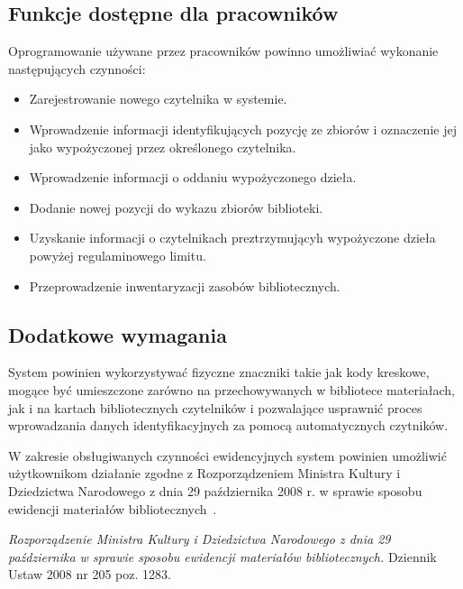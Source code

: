 \documentclass[11pt,a4paper]{article}
\begin{document}
\subsection{Funkcje dostępne dla pracowników}
Oprogramowanie używane przez pracowników powinno umożliwiać wykonanie
następujących czynności: 
\begin{itemize}
  \item Zarejestrowanie nowego czytelnika w systemie.
  \item Wprowadzenie informacji identyfikujących pozycję ze zbiorów i
    oznaczenie jej jako wypożyczonej przez określonego czytelnika.
  \item Wprowadzenie informacji o oddaniu wypożyczonego dzieła.
  \item Dodanie nowej pozycji do wykazu zbiorów biblioteki.
  \item Uzyskanie informacji o czytelnikach preztrzymującyh wypożyczone dzieła
    powyżej regulaminowego limitu.
  \item Przeprowadzenie inwentaryzacji zasobów bibliotecznych.
\end{itemize}

\subsection{Dodatkowe wymagania}
System powinien wykorzystywać fizyczne znaczniki takie jak kody kreskowe,
mogące być umieszczone zarówno na przechowywanych w bibliotece materiałach, jak
i na kartach bibliotecznych czytelników i pozwalające usprawnić proces
wprowadzania danych identyfikacyjnych za pomocą automatycznych czytników. 

W zakresie obsługiwanych czynności ewidencyjnych system powinien
umożliwić użytkownikom działanie zgodne z Rozporządzeniem Ministra Kultury i
Dziedzictwa Narodowego z dnia 29 października 2008 r. w sprawie sposobu
ewidencji materiałów bibliotecznych~\cite{rozpo}.

\newpage


\begin{thebibliography}{99}
   \textit{Rozporządzenie Ministra Kultury i Dziedzictwa
    Narodowego z dnia 29 października w sprawie sposobu ewidencji materiałów
    bibliotecznych.} Dziennik Ustaw 2008 nr 205 poz. 1283.  

\end{thebibliography}
\end{document}

